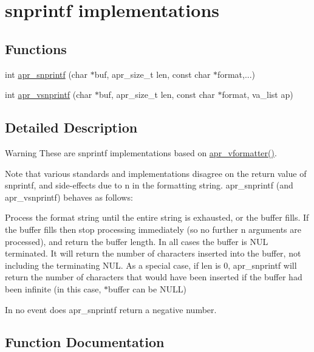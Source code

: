 \hypertarget{group___a_p_r___strings___snprintf}{}\section{snprintf implementations}
\label{group___a_p_r___strings___snprintf}
\subsection*{Functions}
\begin{DoxyCompactItemize}
\item 
int \hyperlink{group___a_p_r___strings___snprintf_gaf0d0becc04278df5172f0ce5905f8ff9}{apr\+\_\+snprintf} (char $\ast$buf, apr\+\_\+size\+\_\+t len, const char $\ast$format,...)
\item 
int \hyperlink{group___a_p_r___strings___snprintf_gaf6bf63e240e48b517644ff3e99e49c26}{apr\+\_\+vsnprintf} (char $\ast$buf, apr\+\_\+size\+\_\+t len, const char $\ast$format, va\+\_\+list ap)
\end{DoxyCompactItemize}


\subsection{Detailed Description}
\begin{DoxyWarning}{Warning}
These are snprintf implementations based on \hyperlink{group__apr__lib_gad2cd3594aeaafd45931d1034965f48c1}{apr\+\_\+vformatter()}.
\end{DoxyWarning}
Note that various standards and implementations disagree on the return value of snprintf, and side-\/effects due to n in the formatting string. apr\+\_\+snprintf (and apr\+\_\+vsnprintf) behaves as follows\+:

Process the format string until the entire string is exhausted, or the buffer fills. If the buffer fills then stop processing immediately (so no further n arguments are processed), and return the buffer length. In all cases the buffer is N\+UL terminated. It will return the number of characters inserted into the buffer, not including the terminating N\+UL. As a special case, if len is 0, apr\+\_\+snprintf will return the number of characters that would have been inserted if the buffer had been infinite (in this case, $\ast$buffer can be N\+U\+LL)

In no event does apr\+\_\+snprintf return a negative number. 

\subsection{Function Documentation}
